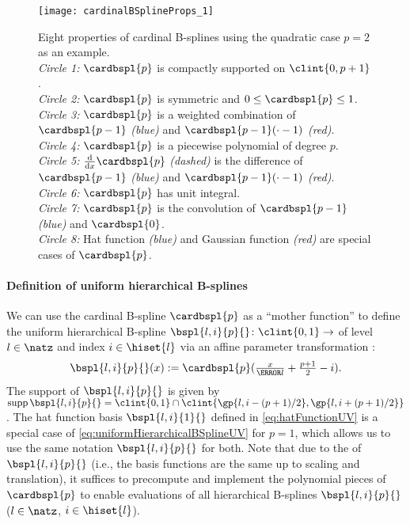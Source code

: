 \begin{figure}
  \texttt{[image: cardinalBSplineProps\_1]}%
  \caption[%
    Properties of cardinal B-splines%
  ]{%
    Eight properties of cardinal B-splines using the quadratic case
    $p = 2$ as an example.\\
    \emph{Circle 1:} $\cardbspl{p}$ is compactly supported on $\clint{0, p+1}$.\\
    \emph{Circle 2:} $\cardbspl{p}$ is symmetric and $0 \le \cardbspl{p} \le 1$.\\
    \emph{Circle 3:} $\cardbspl{p}$ is a weighted combination of
    $\cardbspl{p-1}$ \emph{\textcolor{C0}{(blue)}} and
    $\cardbspl{p-1}({\cdot} - 1)$ \emph{\textcolor{C1}{(red)}}.\\
    \emph{Circle 4:} $\cardbspl{p}$ is a piecewise polynomial of degree $p$.\\
    \emph{Circle 5:} $\frac{\diff}{\dx} \cardbspl{p}$ \emph{(dashed)}
    is the difference of
    $\cardbspl{p-1}$ \emph{\textcolor{C0}{(blue)}} and
    $\cardbspl{p-1}({\cdot} - 1)$ \emph{\textcolor{C1}{(red)}}.\\
    \emph{Circle 6:} $\cardbspl{p}$ has unit integral.\\
    \emph{Circle 7:} $\cardbspl{p}$ is the convolution of
    $\cardbspl{p-1}$ \emph{\textcolor{C0}{(blue)}} and $\cardbspl{0}$.\\
    \emph{Circle 8:} Hat function \emph{\textcolor{C0}{(blue)}} and
    Gaussian function \emph{\textcolor{C1}{(red)}}
    are special cases of $\cardbspl{p}$.%
  }%
  \label{fig:cardinalBSplineProps}%
\end{figure}

\paragraph{Definition of uniform hierarchical B-splines}

We can use the cardinal B-spline $\cardbspl{p}$ as a ``mother function'' to
define the uniform hierarchical B-spline
$\bspl{l,i}{p}{}\colon \clint{0, 1} \to \real$ of level~$l \in \natz$ and index
$i \in \hiset{l}$ via an affine parameter transformation
\cite{Pflueger10Spatially}:
\begin{equation}
  \label{eq:uniformHierarchicalBSplineUV}
  \bspl{l,i}{p}{}(x)
  := \cardbspl{p}(\tfrac{x}{\ms{l}} + \tfrac{p+1}{2} - i).
\end{equation}
The support of $\bspl{l,i}{p}{}$ is given
by $\supp \bspl{l,i}{p}{} = \clint{0, 1} \cap \clint{\gp{l,i-(p+1)/2}, \gp{l,i+(p+1)/2}}$.
The hat function basis $\bspl{l,i}{1}{}$ defined in
\eqref{eq:hatFunctionUV} is a special case of
\eqref{eq:uniformHierarchicalBSplineUV} for $p = 1$,
which allows us to use the same notation $\bspl{l,i}{p}{}$ for both.
Note that due to the  of $\bspl{l,i}{p}{}$
(i.e., the basis functions are the same up to scaling and translation),
it suffices to precompute and implement the polynomial pieces of $\cardbspl{p}$
to enable evaluations of all hierarchical B-splines
$\bspl{l,i}{p}{}$ ($l \in \natz$, $i \in \hiset{l}$).

